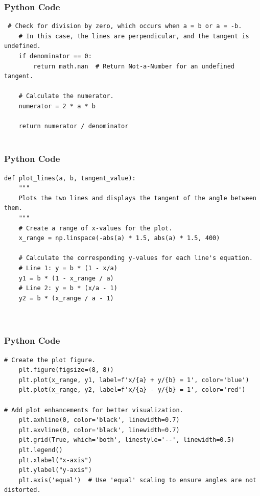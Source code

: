 \documentclass{beamer}
\begin{document}
\begin{frame}[fragile]
    \frametitle{Python Code }
    \begin{lstlisting}
 # Check for division by zero, which occurs when a = b or a = -b.
    # In this case, the lines are perpendicular, and the tangent is undefined.
    if denominator == 0:
        return math.nan  # Return Not-a-Number for an undefined tangent.

    # Calculate the numerator.
    numerator = 2 * a * b

    return numerator / denominator


\end{lstlisting}
\end{frame}

\begin{frame}[fragile]
    \frametitle{Python Code }
    \begin{lstlisting}
def plot_lines(a, b, tangent_value):
    """
    Plots the two lines and displays the tangent of the angle between them.
    """
    # Create a range of x-values for the plot.
    x_range = np.linspace(-abs(a) * 1.5, abs(a) * 1.5, 400)

    # Calculate the corresponding y-values for each line's equation.
    # Line 1: y = b * (1 - x/a)
    y1 = b * (1 - x_range / a)
    # Line 2: y = b * (x/a - 1)
    y2 = b * (x_range / a - 1)

    

\end{lstlisting}
\end{frame}

\begin{frame}[fragile]
    \frametitle{Python Code }
    \begin{lstlisting}
# Create the plot figure.
    plt.figure(figsize=(8, 8))
    plt.plot(x_range, y1, label=f'x/{a} + y/{b} = 1', color='blue')
    plt.plot(x_range, y2, label=f'x/{a} - y/{b} = 1', color='red')

# Add plot enhancements for better visualization.
    plt.axhline(0, color='black', linewidth=0.7)
    plt.axvline(0, color='black', linewidth=0.7)
    plt.grid(True, which='both', linestyle='--', linewidth=0.5)
    plt.legend()
    plt.xlabel("x-axis")
    plt.ylabel("y-axis")
    plt.axis('equal')  # Use 'equal' scaling to ensure angles are not distorted.

    

\end{lstlisting}
\end{frame}
\end{document}
